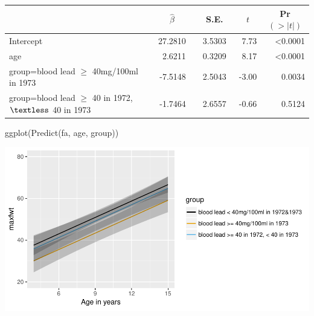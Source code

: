  \setlongtables\begin{longtable}{lrrrr}\hline
 \multicolumn{1}{l}{}&\multicolumn{1}{c}{$\hat{\beta}$}&\multicolumn{1}{c}{S.E.}&\multicolumn{1}{c}{$t$}&\multicolumn{1}{c}{Pr$(>|t|)$}\tabularnewline
 \hline
 \endhead
 \hline
 \endfoot
 Intercept&~27.2810~&~3.5303~& 7.73&\textless 0.0001\tabularnewline
 age&~ 2.6211~&~0.3209~& 8.17&\textless 0.0001\tabularnewline
 group=blood lead $\geq$ 40mg/100ml in 1973&~-7.5148~&~2.5043~&-3.00&0.0034\tabularnewline
 group=blood lead $\geq$ 40 in 1972, $\textless $ 40 in 1973&~-1.7464~&~2.6557~&-0.66&0.5124\tabularnewline
 \hline
 \end{longtable}
 \addtocounter{table}{-1}
\begin{Sinput}
ggplot(Predict(fa, age, group))
\end{Sinput}


\centerline{\includegraphics{reg-leadgrage-1} }


